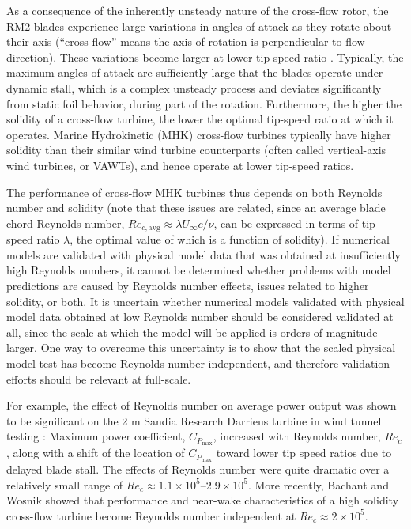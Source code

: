 \documentclass[10pt,letterpaper]{article}
\begin{document}
As a consequence of the inherently unsteady nature of the cross-flow rotor, the
RM2 blades experience large variations in angles of attack as they rotate about
their axis (``cross-flow'' means the axis of rotation is perpendicular to flow
direction). These variations become larger at lower tip speed ratio
\cite{Para2002}. Typically, the maximum angles of attack are sufficiently large
that the blades operate under dynamic stall, which is a complex unsteady process
and deviates significantly from static foil behavior, during part of the
rotation. Furthermore, the higher the solidity of a cross-flow turbine, the
lower the optimal tip-speed ratio at which it operates. Marine Hydrokinetic
(MHK) cross-flow turbines typically have higher solidity than their similar wind
turbine counterparts (often called vertical-axis wind turbines, or VAWTs), and
hence operate at lower tip-speed ratios.

The performance of cross-flow MHK turbines thus depends on both Reynolds number
and solidity (note that these issues are related, since an average blade chord
Reynolds number, $Re_{c,\mathrm{avg}} \approx \lambda U_\infty c/ \nu$, can be
expressed in terms of tip speed ratio $\lambda$, the optimal value of which is a
function of solidity). If numerical models are validated with physical model
data that was obtained at insufficiently high Reynolds numbers, it cannot be
determined whether problems with model predictions are caused by Reynolds number
effects, issues related to higher solidity, or both. It is uncertain whether
numerical models validated with physical model data obtained at low Reynolds
number should be considered validated at all, since the scale at which the model
will be applied is orders of magnitude larger. One way to overcome this
uncertainty is to show that the scaled physical model test has become Reynolds
number independent, and therefore validation efforts should be relevant at
full-scale.

For example, the effect of Reynolds number on average power output was shown to
be significant on the 2 m Sandia Research Darrieus turbine in wind tunnel
testing \cite{Blackwell1976}: Maximum power coefficient, $C_{P_{\max}}$,
increased with Reynolds number, $Re_c$, along with a shift of the location of
$C_{P_{\max}}$ toward lower tip speed ratios due to delayed blade stall. The
effects of Reynolds number were quite dramatic over a relatively small range of
$Re_c \approx 1.1 \times 10^5$--$2.9 \times 10^5$. More recently, Bachant and
Wosnik \cite{Bachant2014, Bachant2015-RVAT-Re-dep} showed that performance and
near-wake characteristics of a high solidity cross-flow turbine become Reynolds
number independent at $Re_c \approx 2 \times 10^5$.
\end{document}
